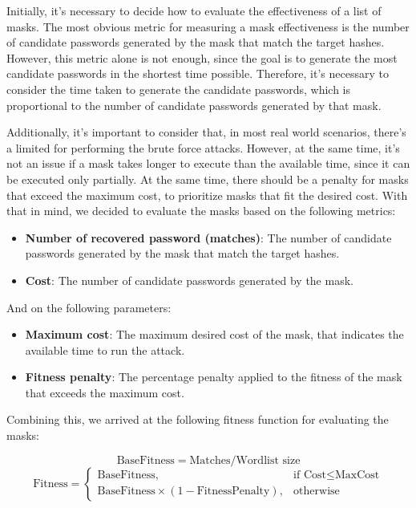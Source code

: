 \documentclass[sigconf,authordraft]{acmart}
\begin{document}
Initially, it's necessary to decide how to evaluate the effectiveness of a list of masks.
The most obvious metric for measuring a mask effectiveness is the number of candidate passwords generated by the mask that match the target hashes.
However, this metric alone is not enough, since the goal is to generate the most candidate passwords in the shortest time possible.
Therefore, it's necessary to consider the time taken to generate the candidate passwords, which is proportional to the number of candidate passwords generated by that mask.

Additionally, it's important to consider that, in most real world scenarios, there's a limited for performing the brute force attacks.
However, at the same time, it's not an issue if a mask takes longer to execute than the available time, since it can be executed only partially.
At the same time, there should be a penalty for masks that exceed the maximum cost, to prioritize masks that fit the desired cost.
With that in mind, we decided to evaluate the masks based on the following metrics:

\begin{itemize}
  \item \textbf{Number of recovered password (matches)}: The number of candidate passwords generated by the mask that match the target hashes.
  \item \textbf{Cost}: The number of candidate passwords generated by the mask.
\end{itemize}

And on the following parameters:

\begin{itemize}
  \item \textbf{Maximum cost}: The maximum desired cost of the mask, that indicates the available time to run the attack.
  \item \textbf{Fitness penalty}: The percentage penalty applied to the fitness of the mask that exceeds the maximum cost.
\end{itemize}

Combining this, we arrived at the following fitness function for evaluating the masks:

\begin{equation}
\label{eq:fitness_function}
  \text{BaseFitness} = \text{Matches} / \text{Wordlist size}
\end{equation}
\begin{equation}
  \text{Fitness} = 
  \begin{cases}
    \text{BaseFitness}, & \text{if Cost} \leq \text{MaxCost} \\
    \text{BaseFitness} \times ( 1 - \text{FitnessPenalty}), & \text{otherwise}
  \end{cases}
\end{equation}
\end{document}
